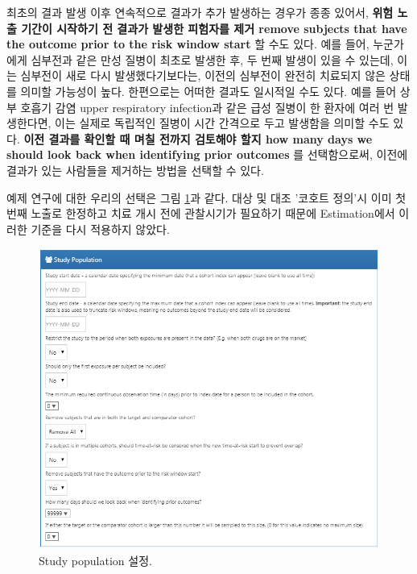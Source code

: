 \documentclass[11pt]{book}
\theoremstyle{definition}
\theoremstyle{definition}
\theoremstyle{definition}
\theoremstyle{remark}
\begin{document}
최초의 결과 발생 이후 연속적으로 결과가 추가 발생하는 경우가 종종
있어서, \textbf{위험 노출 기간이 시작하기 전 결과가 발생한 피험자를 제거
remove subjects that have the outcome prior to the risk window start} 할
수도 있다. 예를 들어, 누군가에게 심부전과 같은 만성 질병이 최초로 발생한
후, 두 번째 발생이 있을 수 있는데, 이는 심부전이 새로 다시
발생했다기보다는, 이전의 심부전이 완전히 치료되지 않은 상태를 의미할
가능성이 높다. 한편으로는 어떠한 결과도 일시적일 수도 있다. 예를 들어
상부 호흡기 감염 upper respiratory infection과 같은 급성 질병이 한
환자에 여러 번 발생한다면, 이는 실제로 독립적인 질병이 시간 간격으로
두고 발생함을 의미할 수도 있다. \textbf{이전 결과를 확인할 때 며칠
전까지 검토해야 할지 how many days we should look back when identifying
prior outcomes} 를 선택함으로써, 이전에 결과가 있는 사람들을 제거하는
방법을 선택할 수 있다.

예제 연구에 대한 우리의 선택은 그림 \ref{fig:studyPopulation}과 같다.
대상 및 대조 '코호트 정의'시 이미 첫 번째 노출로 한정하고 치료 개시 전에
관찰시기가 필요하기 때문에 Estimation에서 이러한 기준을 다시 적용하지
않았다.

\begin{figure}

{\centering \includegraphics[width=1\linewidth]{images/PopulationLevelEstimation/studyPopulation} 

}

\caption{Study population 설정.}\label{fig:studyPopulation}
\end{figure}
\end{document}
